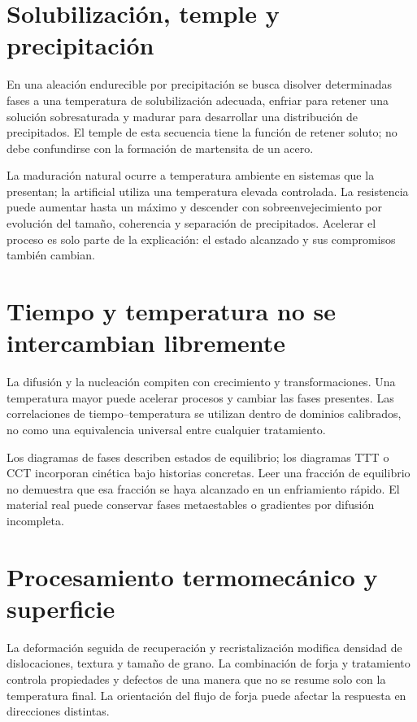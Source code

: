 \section{Solubilización, temple y precipitación}
En una aleación endurecible por precipitación se busca disolver determinadas fases a una temperatura de solubilización adecuada, enfriar para retener una solución sobresaturada y madurar para desarrollar una distribución de precipitados. El temple de esta secuencia tiene la función de retener soluto; no debe confundirse con la formación de martensita de un acero.

La maduración natural ocurre a temperatura ambiente en sistemas que la presentan; la artificial utiliza una temperatura elevada controlada. La resistencia puede aumentar hasta un máximo y descender con sobreenvejecimiento por evolución del tamaño, coherencia y separación de precipitados. Acelerar el proceso es solo parte de la explicación: el estado alcanzado y sus compromisos también cambian.
\section{Tiempo y temperatura no se intercambian libremente}
La difusión y la nucleación compiten con crecimiento y transformaciones. Una temperatura mayor puede acelerar procesos y cambiar las fases presentes. Las correlaciones de tiempo--temperatura se utilizan dentro de dominios calibrados, no como una equivalencia universal entre cualquier tratamiento.

Los diagramas de fases describen estados de equilibrio; los diagramas TTT o CCT incorporan cinética bajo historias concretas. Leer una fracción de equilibrio no demuestra que esa fracción se haya alcanzado en un enfriamiento rápido. El material real puede conservar fases metaestables o gradientes por difusión incompleta.
\section{Procesamiento termomecánico y superficie}
La deformación seguida de recuperación y recristalización modifica densidad de dislocaciones, textura y tamaño de grano. La combinación de forja y tratamiento controla propiedades y defectos de una manera que no se resume solo con la temperatura final. La orientación del flujo de forja puede afectar la respuesta en direcciones distintas.

